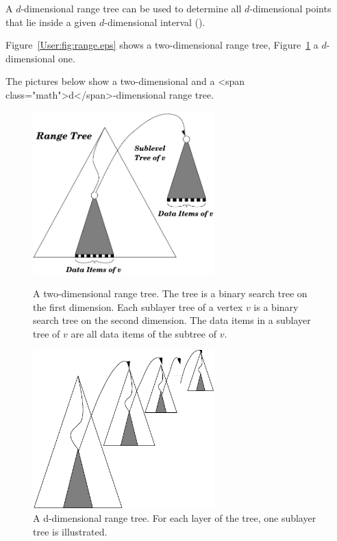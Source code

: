A $d$-dimensional range tree can be used to determine all
$d$-dimensional points that lie inside  a given $d$-dimensional
interval ().
\begin{ccTexOnly}
Figure~\ref{User:fig:range.eps} shows a two-dimensional range tree,
Figure~\ref{User:fig:d-range.eps} a $d$-dimensional one.
\end{ccTexOnly}
\begin{ccHtmlOnly}
The pictures below show a two-dimensional and a <span class="math">d</span>-dimensional
range tree.
\end{ccHtmlOnly}
\begin{ccTexOnly}
    \begin{figure}[htbp]
    \begin{minipage}{7cm}
    \begin{center}
    \includegraphics[width=7cm,clip]{SearchStructures/range2}
    \end{center}
    \caption{\label{User:fig:range.eps}A two-dimensional range tree. The
      tree is a binary search tree on the first dimension. Each
      sublayer tree of a vertex $v$ is a binary search tree on the second
      dimension. The data items in a sublayer tree of $v$ are
      all data items of the subtree of $v$.}
    \end{minipage}
    \hspace*{1em}
    \begin{minipage}{7cm}
    \begin{center}
    \includegraphics[width=7cm,clip]{SearchStructures/d-range}
    \end{center}
    \caption{\label{User:fig:d-range.eps}A d-dimensional range tree. For
      each layer of the tree, one
      sublayer tree is illustrated.}
    \vspace{2\baselineskip}
    \end{minipage}
    \end{figure}
\end{ccTexOnly}

